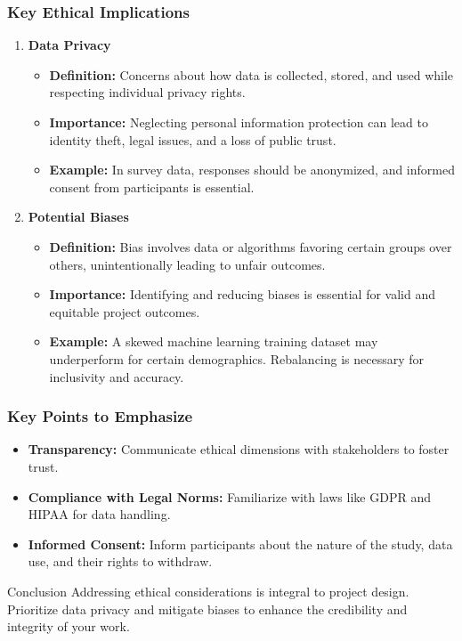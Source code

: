 \documentclass[aspectratio=169]{beamer}
\begin{document}
\begin{frame}[fragile]
    \frametitle{Key Ethical Implications}
    \begin{enumerate}
        \item \textbf{Data Privacy}
            \begin{itemize}
                \item \textbf{Definition:} Concerns about how data is collected, stored, and used while respecting individual privacy rights.
                \item \textbf{Importance:} Neglecting personal information protection can lead to identity theft, legal issues, and a loss of public trust.
                \item \textbf{Example:} In survey data, responses should be anonymized, and informed consent from participants is essential.
            \end{itemize}

        \item \textbf{Potential Biases}
            \begin{itemize}
                \item \textbf{Definition:} Bias involves data or algorithms favoring certain groups over others, unintentionally leading to unfair outcomes.
                \item \textbf{Importance:} Identifying and reducing biases is essential for valid and equitable project outcomes.
                \item \textbf{Example:} A skewed machine learning training dataset may underperform for certain demographics. Rebalancing is necessary for inclusivity and accuracy.
            \end{itemize}
    \end{enumerate}
\end{frame}

\begin{frame}[fragile]
    \frametitle{Key Points to Emphasize}
    \begin{itemize}
        \item \textbf{Transparency:} Communicate ethical dimensions with stakeholders to foster trust.
        \item \textbf{Compliance with Legal Norms:} Familiarize with laws like GDPR and HIPAA for data handling.
        \item \textbf{Informed Consent:} Inform participants about the nature of the study, data use, and their rights to withdraw.
    \end{itemize}
    
    \begin{block}{Conclusion}
        Addressing ethical considerations is integral to project design. Prioritize data privacy and mitigate biases to enhance the credibility and integrity of your work.
    \end{block}
\end{frame}
\end{document}

